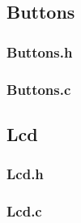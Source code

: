 \documentclass[fleqn]{article}
\begin{document}
\noindent\begin{minipage}[t]{.45\textwidth}
	
\end{minipage}\hfill
\noindent\begin{minipage}[t]{.45\textwidth}
	
	\subsection{Buttons}
	\subsubsection{Buttons.h}
	
	\subsubsection{Buttons.c}
	
\end{minipage}\hfill

\pagebreak

\subsection{Lcd}

\noindent\begin{minipage}[t]{.45\textwidth}
	\subsubsection{Lcd.h}
	
\end{minipage}\hfill
\noindent\begin{minipage}[t]{.45\textwidth}
	\subsubsection{Lcd.c}
	
\end{minipage}\hfill

\pagebreak
\end{document}
